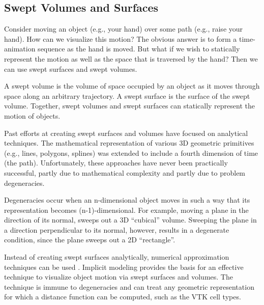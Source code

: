 \clearpage

\subsection{Swept Volumes and Surfaces}

Consider moving an object (e.g., your hand) over some path (e.g., raise your hand). How can we visualize this motion? The obvious answer is to form a time-animation sequence as the hand is moved. But what if we wish to statically represent the motion as well as the space that is traversed by the hand? Then we can use swept surfaces and swept volumes.

A swept volume is the volume of space occupied by an object as it moves through space along an arbitrary trajectory. A swept surface is the surface of the swept volume. Together, swept volumes and swept surfaces can statically represent the motion of objects.

Past efforts at creating swept surfaces and volumes have focused on analytical techniques. The mathematical representation of various 3D geometric primitives (e.g., lines, polygons, splines) was extended to include a fourth dimension of time (the path). Unfortunately, these approaches have never been practically successful, partly due to mathematical complexity and partly due to problem degeneracies.

Degeneracies occur when an n-dimensional object moves in such a way that its representation becomes (n-1)-dimensional. For example, moving a plane in the direction of its normal, sweeps out a 3D ``cubical'' volume. Sweeping the plane in a direction perpendicular to its normal, however, results in a degenerate condition, since the plane sweeps out a 2D ``rectangle''.

Instead of creating swept surfaces analytically, numerical approximation techniques can be used \cite{Schroeder94}. Implicit modeling provides the basis for an effective technique to visualize object motion via swept surfaces and volumes. The technique is immune to degeneracies and can treat any geometric representation for which a distance function can be computed, such as the VTK cell types.

